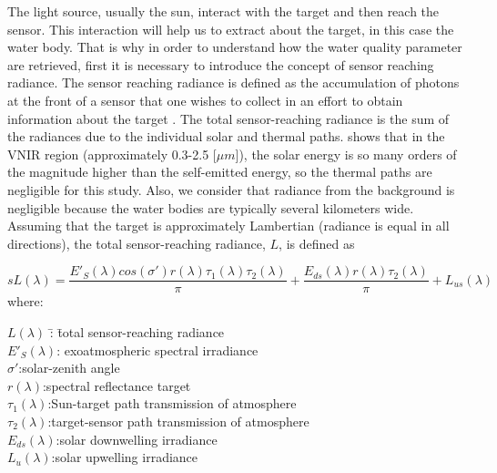 The light source, usually the sun, interact with the target and then reach the sensor. This interaction will help us to extract about the target, in this case the water body. That is why in order to understand how the water quality parameter are retrieved, first it is necessary to introduce the concept of sensor reaching radiance. The sensor reaching radiance is defined as the accumulation of photons at the front of a sensor that one wishes to collect in an effort to obtain information about the target \cite{Gerace}. The total sensor-reaching radiance is the sum of the radiances due to the individual solar and thermal paths.  \cite{Schott} shows that in the VNIR region (approximately 0.3-2.5 [$\mu m$]), the solar energy is so many orders of the magnitude higher than the self-emitted energy, so the thermal paths are negligible for this study. Also, we consider that radiance from the background is negligible because the water bodies are typically several kilometers wide. Assuming that the target is approximately Lambertian (radiance is equal in all directions), the total sensor-reaching radiance, $L$, is defined as

\begin{equation} \label{eq:gov1}s
L(\lambda) = \frac{E'_S(\lambda)cos(\sigma')r(\lambda)\tau_1(\lambda)\tau_2(\lambda)}{\pi} +
                        \frac{E_{ds}(\lambda)r(\lambda)\tau_2(\lambda)}{\pi} + L_{us}(\lambda)
\end{equation} 
where:
\begin{tabbing}
\indent \indent \indent  $L(\lambda)$ \hspace{1mm}\=:  \indent \= total sensor-reaching radiance\\
\indent \indent \indent  $E'_S(\lambda)$\>: \>exoatmospheric spectral irradiance\\
\indent \indent \indent $\sigma'$\>:\>solar-zenith angle\\
\indent \indent \indent $r(\lambda)$\>:\>spectral reflectance target\\
\indent \indent \indent $\tau_1(\lambda)$\>:\>Sun-target path transmission of atmosphere\\
\indent \indent \indent $\tau_2(\lambda)$\>:\>target-sensor path transmission of atmosphere\\
\indent \indent \indent $E_{ds}(\lambda)$\>:\>solar downwelling irradiance\\
\indent \indent \indent $L_{u}(\lambda)$\>:\>solar upwelling irradiance\\
\end{tabbing}

